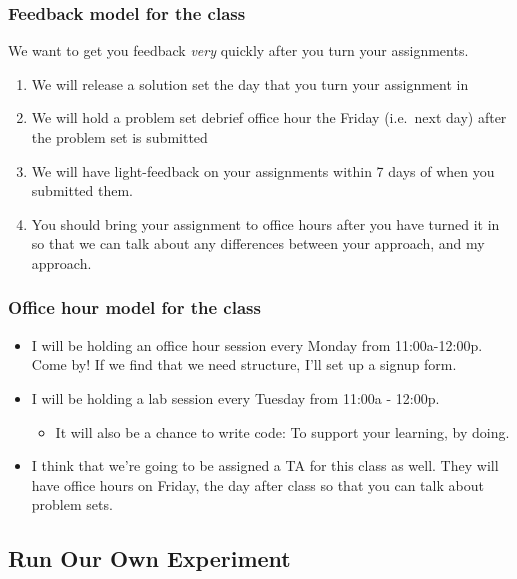 \documentclass[
]{article}
\providecommand{\tightlist}{%
  \setlength{\itemsep}{0pt}\setlength{\parskip}{0pt}}
\theoremstyle{definition}
\theoremstyle{definition}
\theoremstyle{definition}
\theoremstyle{definition}
\theoremstyle{remark}
\begin{document}
\subsubsection{Feedback model for the class}\label{feedback-model-for-the-class}

We want to get you feedback \emph{very} quickly after you turn your assignments.

\begin{enumerate}
\def\labelenumi{\arabic{enumi}.}
\tightlist
\item
  We will release a solution set the day that you turn your assignment in
\item
  We will hold a problem set debrief office hour the Friday (i.e.~next day) after the problem set is submitted
\item
  We will have light-feedback on your assignments within 7 days of when you submitted them.
\item
  You should bring your assignment to office hours after you have turned it in so that we can talk about any differences between your approach, and my approach.
\end{enumerate}

\subsubsection{Office hour model for the class}\label{office-hour-model-for-the-class}

\begin{itemize}
\tightlist
\item
  I will be holding an office hour session every Monday from 11:00a-12:00p. Come by! If we find that we need structure, I'll set up a signup form.
\item
  I will be holding a lab session every Tuesday from 11:00a - 12:00p.

  \begin{itemize}
  \tightlist
  \item
    It will also be a chance to write code: To support your learning, by doing.
  \end{itemize}
\item
  I think that we're going to be assigned a TA for this class as well. They will have office hours on Friday, the day after class so that you can talk about problem sets.
\end{itemize}

\subsection{Run Our Own Experiment}\label{run-our-own-experiment}
\end{document}
